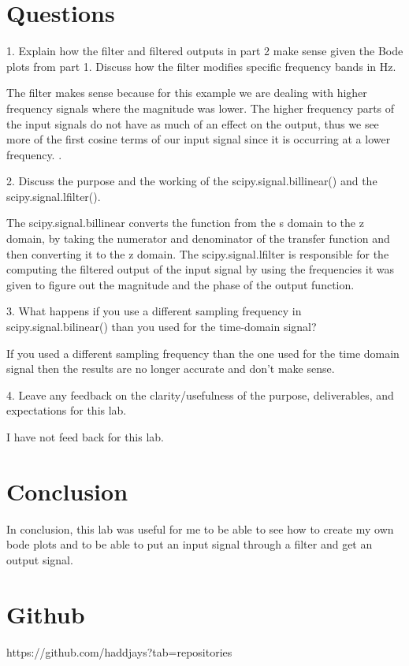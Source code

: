 \documentclass[11pt,a4]{report}
\begin{document}
\section{Questions}
1. Explain how the filter and filtered outputs in part 2 make sense given the Bode plots from part 1. Discuss how the filter modifies specific frequency bands in Hz. 

The filter makes sense because for this example we are dealing with higher frequency signals where the magnitude was lower. The higher frequency parts of the input signals do not have as much of an effect on the output, thus we see more of the first cosine terms of our input signal since it is occurring at a lower frequency. . 


2. Discuss the purpose and the working of the scipy.signal.billinear() and the scipy.signal.lfilter(). 

The scipy.signal.billinear converts the function from the s domain to the z domain, by taking the numerator and denominator of the transfer function and then converting it to the z domain. The scipy.signal.lfilter is responsible for the computing the filtered output of the input signal by using the frequencies it was given to figure out the magnitude and the phase of the output function. 


3. What happens if you use a different sampling frequency in scipy.signal.bilinear() than you used for the time-domain signal?

If you used a different sampling frequency than the one used for the time domain signal then the results are no longer accurate and don't make sense. 

4. Leave any feedback on the clarity/usefulness of the purpose, deliverables, and expectations
for this lab.

I have not feed back for this lab.

\section{Conclusion}
In conclusion, this lab was useful for me to be able to see how to create my own bode plots and to be able to put an input signal through a filter and get an output signal. 


\section{Github}
https://github.com/haddjays?tab=repositories
\end{document}
